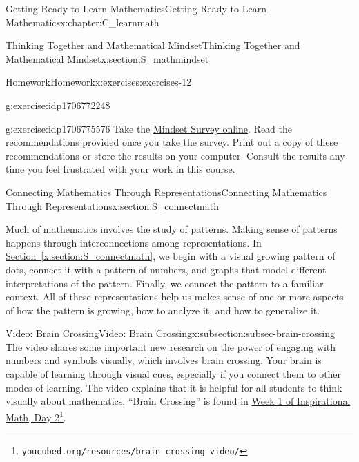 \documentclass[oneside,10pt,]{book}
\newcommand{\xreffont}{\relax}
\numberwithin{equation}{chapter}
\begin{document}
\begin{chapterptx}{Getting Ready to Learn Mathematics}{}{Getting Ready to Learn Mathematics}{}{}{x:chapter:C_learnmath}
\begin{sectionptx}{Thinking Together and Mathematical Mindset}{}{Thinking Together and Mathematical Mindset}{}{}{x:section:S_mathmindset}
\begin{exercises-subsection}{Homework}{}{Homework}{}{}{x:exercises:exercises-12}
\begin{divisionexercise}{2}{}{}{g:exercise:idp1706772248}
\end{divisionexercise}%
\begin{divisionexercise}{3}{}{}{g:exercise:idp1706775576}%
Take the \href{https://www.mindsetworks.com/assess/}{Mindset Survey online}\footnotemark{}. Read the recommendations provided once you take the survey. Print out a copy of these recommendations or store the results on your computer. Consult the results any time you feel frustrated with your work in this course.%
\end{divisionexercise}%
%
\end{exercises-subsection}
\end{sectionptx}
%
%
\typeout{************************************************}
\typeout{************************************************}
%
\begin{sectionptx}{Connecting Mathematics Through Representations}{}{Connecting Mathematics Through Representations}{}{}{x:section:S_connectmath}
\begin{introduction}{}%
Much of mathematics involves the study of patterns. Making sense of patterns happens through interconnections among representations. In \hyperref[x:section:S_connectmath]{Section~{\xreffont\ref{x:section:S_connectmath}}}, we begin with a visual growing pattern of dots, connect it with a pattern of numbers, and graphs that model different interpretations of the pattern. Finally, we connect the pattern to a familiar context. All of these representations help us makes sense of one or more aspects of how the pattern is growing, how to analyze it, and how to generalize it.%
\end{introduction}%
%
%
\typeout{************************************************}
\typeout{************************************************}
%
\begin{subsectionptx}{Video: Brain Crossing}{}{Video: Brain Crossing}{}{}{x:subsection:subsec-brain-crossing}
The video shares some important new research on the power of engaging with numbers and symbols visually, which involves brain crossing. Your brain is capable of learning through visual cues, especially if you connect them to other modes of learning. The video explains that it is helpful for all students to think visually about mathematics. ``Brain Crossing'' is found in \href{https://www.youcubed.org/resources/brain-crossing-video/}{Week 1 of Inspirational Math, Day 2}\footnote{\nolinkurl{youcubed.org/resources/brain-crossing-video/}\label{g:fn:idp1706510744}}.%

\end{subsectionptx}
\end{sectionptx}
\end{chapterptx}
\end{document}
